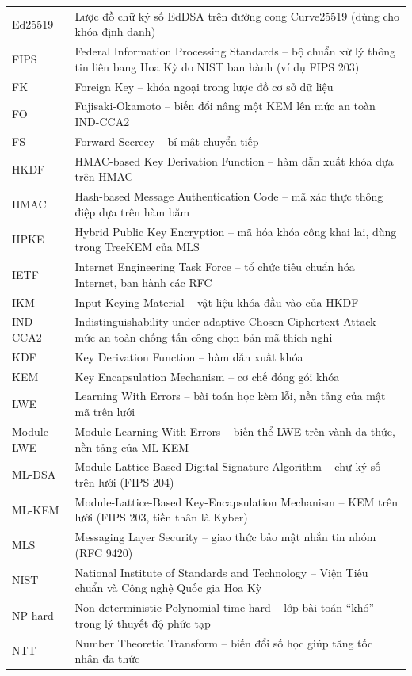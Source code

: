 \begin{longtable}{p{2.7cm} p{12.3cm}}
Ed25519 & Lược đồ chữ ký số EdDSA trên đường cong Curve25519 (dùng cho khóa định danh) \\
FIPS & Federal Information Processing Standards -- bộ chuẩn xử lý thông tin liên bang Hoa Kỳ do NIST ban hành (ví dụ FIPS 203) \\
FK & Foreign Key -- khóa ngoại trong lược đồ cơ sở dữ liệu \\
FO & Fujisaki-Okamoto -- biến đổi nâng một KEM lên mức an toàn IND-CCA2 \\
FS & Forward Secrecy -- bí mật chuyển tiếp \\
HKDF & HMAC-based Key Derivation Function -- hàm dẫn xuất khóa dựa trên HMAC \\
HMAC & Hash-based Message Authentication Code -- mã xác thực thông điệp dựa trên hàm băm \\
HPKE & Hybrid Public Key Encryption -- mã hóa khóa công khai lai, dùng trong TreeKEM của MLS \\
IETF & Internet Engineering Task Force -- tổ chức tiêu chuẩn hóa Internet, ban hành các RFC \\
IKM & Input Keying Material -- vật liệu khóa đầu vào của HKDF \\
IND-CCA2 & Indistinguishability under adaptive Chosen-Ciphertext Attack -- mức an toàn chống tấn công chọn bản mã thích nghi \\
KDF & Key Derivation Function -- hàm dẫn xuất khóa \\
KEM & Key Encapsulation Mechanism -- cơ chế đóng gói khóa \\
LWE & Learning With Errors -- bài toán học kèm lỗi, nền tảng của mật mã trên lưới \\
Module-LWE & Module Learning With Errors -- biến thể LWE trên vành đa thức, nền tảng của ML-KEM \\
ML-DSA & Module-Lattice-Based Digital Signature Algorithm -- chữ ký số trên lưới (FIPS 204) \\
ML-KEM & Module-Lattice-Based Key-Encapsulation Mechanism -- KEM trên lưới (FIPS 203, tiền thân là Kyber) \\
MLS & Messaging Layer Security -- giao thức bảo mật nhắn tin nhóm (RFC 9420) \\
NIST & National Institute of Standards and Technology -- Viện Tiêu chuẩn và Công nghệ Quốc gia Hoa Kỳ \\
NP-hard & Non-deterministic Polynomial-time hard -- lớp bài toán ``khó'' trong lý thuyết độ phức tạp \\
NTT & Number Theoretic Transform -- biến đổi số học giúp tăng tốc nhân đa thức \\

\end{longtable}
